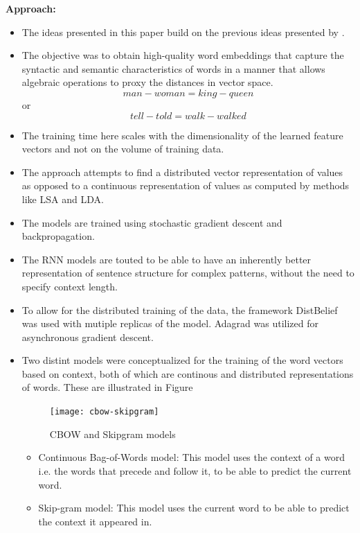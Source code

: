 \documentclass[11pt,a4paper]{article}
\begin{document}
  \textbf{Approach:}
  \begin{itemize}
    \item 
    The ideas presented in this paper build on the previous ideas presented by \cite{bengio2003neural}.
    \item 
    The objective was to obtain high-quality word embeddings that capture the syntactic and semantic characteristics of words in a manner that allows algebraic operations to proxy the distances in vector space.
    $$man - woman = king - queen$$ or $$tell - told = walk - walked$$
    \item 
    The training time here scales with the dimensionality of the learned feature vectors and not on the volume of training data.
    \item 
    The approach attempts to find a distributed vector representation of values as opposed to a continuous representation of values as computed by methods like LSA and LDA.
    \item 
    The models are trained using stochastic gradient descent and backpropagation.
    \item 
    The RNN models are touted to be able to have an inherently better representation of sentence structure for complex patterns, without the need to specify context length.
    \item 
    To allow for the distributed training of the data, the framework DistBelief was used with mutiple replicas of the model. Adagrad was utilized for asynchronous gradient descent.
    \item 
    Two distint models were conceptualized for the training of the word vectors based on context, both of which are continous and distributed representations of words. These are illustrated in Figure
    \begin{figure}[ht]
      \centering
      \texttt{[image: cbow-skipgram]}
      \caption{CBOW and Skipgram models}
      \label{fig:cbow-skipgram}
    \end{figure}
    \begin{itemize}
      \item 
      Continuous Bag-of-Words model: This model uses the context of a word i.e. the words that precede and follow it, to be able to predict the current word.
      \item 
      Skip-gram model: This model uses the current word to be able to predict the context it appeared in.
    \end{itemize}
  \end{itemize}
\end{document}
